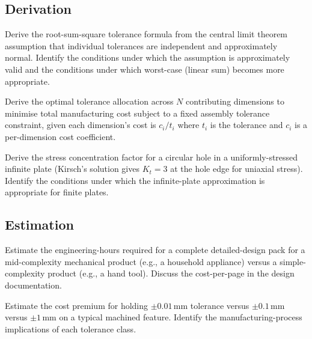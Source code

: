 \subsection*{Derivation}

\begin{exercise}
Derive the root-sum-square tolerance formula from the central limit theorem assumption that individual tolerances are independent and approximately normal. Identify the conditions under which the assumption is approximately valid and the conditions under which worst-case (linear sum) becomes more appropriate.
\end{exercise}

\begin{exercise}
Derive the optimal tolerance allocation across $N$ contributing dimensions to minimise total manufacturing cost subject to a fixed assembly tolerance constraint, given each dimension's cost is $c_i / t_i$ where $t_i$ is the tolerance and $c_i$ is a per-dimension cost coefficient.
\end{exercise}

\begin{exercise}
Derive the stress concentration factor for a circular hole in a uniformly-stressed infinite plate (Kirsch's solution gives $K_t = 3$ at the hole edge for uniaxial stress). Identify the conditions under which the infinite-plate approximation is appropriate for finite plates.
\end{exercise}

\subsection*{Estimation}

\begin{exercise}
Estimate the engineering-hours required for a complete detailed-design pack for a mid-complexity mechanical product (e.g., a household appliance) versus a simple-complexity product (e.g., a hand tool). Discuss the cost-per-page in the design documentation.
\end{exercise}

\begin{exercise}
Estimate the cost premium for holding $\pm 0.01\,\text{mm}$ tolerance versus $\pm 0.1\,\text{mm}$ versus $\pm 1\,\text{mm}$ on a typical machined feature. Identify the manufacturing-process implications of each tolerance class.
\end{exercise}

